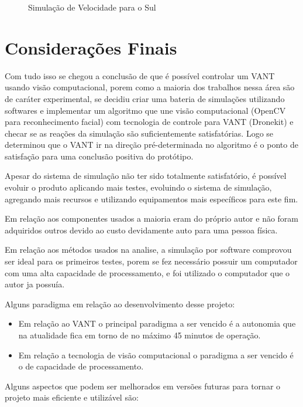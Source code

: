 \begin{figure}[H]
	\centering	
	\caption{Simulação de Velocidade para o Sul}
	\def\svgwidth{15cm}
	
	\label{fig:vel4}
\end{figure}
 
\section{Considerações Finais}

Com tudo isso se chegou a conclusão de que é possível controlar um VANT usando visão computacional, porem como a maioria dos trabalhos nessa área são de caráter experimental, se decidiu criar uma bateria de simulações utilizando softwares e implementar um algoritmo que une visão computacional (OpenCV para reconhecimento facial) com tecnologia de controle para VANT (Dronekit) e checar se as reações da simulação são suficientemente satisfatórias. Logo se determinou que o VANT ir na direção pré-determinada no algoritmo é o ponto de satisfação para uma conclusão positiva do protótipo.

Apesar do sistema de simulação não ter sido totalmente satisfatório, é possível evoluir o produto aplicando mais testes, evoluindo o sistema de simulação, agregando mais recursos e utilizando equipamentos mais específicos para este fim.

Em relação aos componentes usados a maioria eram do próprio autor e não foram adquiridos outros devido ao custo devidamente auto para uma pessoa física.  
 
Em relação aos métodos usados na analise, a simulação por software comprovou ser ideal para os primeiros testes, porem se fez necessário possuir um computador com uma alta capacidade de processamento, e foi utilizado o computador que o autor ja possuía. 

Alguns paradigma em relação ao desenvolvimento desse projeto:

\begin{itemize}
	\item Em relação ao VANT o principal paradigma a ser vencido é a autonomia que na atualidade fica em torno de no máximo 45 minutos de operação.
	\item Em relação a tecnologia de visão computacional o paradigma a ser vencido é o de capacidade de processamento.
\end{itemize}

Alguns aspectos que podem ser melhorados em versões futuras para tornar o projeto
mais eficiente e utilizável são:

